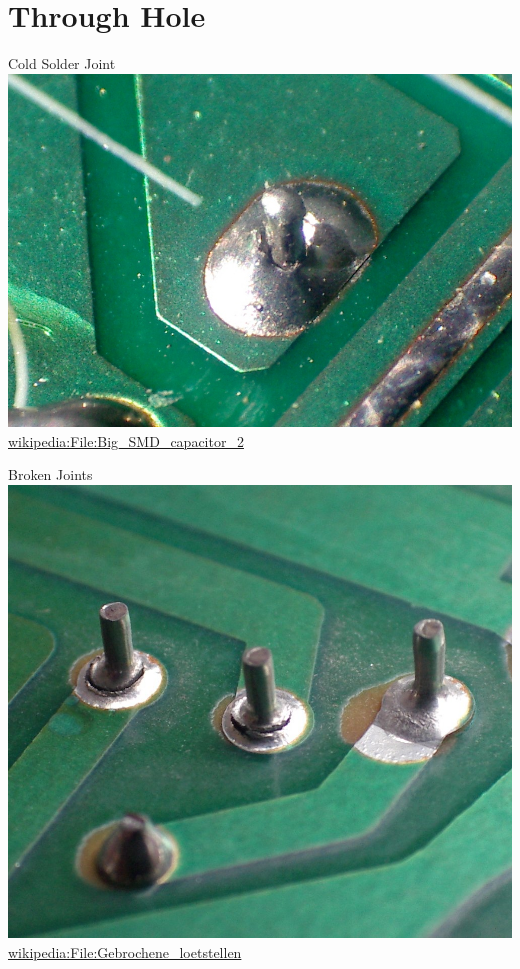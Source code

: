 \documentclass{presentation}
\begin{document}
\section{Through Hole}

\begin{frame}{Cold Solder Joint}
  \centering
  \includegraphics[width=\textwidth*3/4]{./Cold_solder_joint2.jpg} \\
  \url{wikipedia:File:Big_SMD_capacitor_2}
\end{frame}

\begin{frame}{Broken Joints}
  \centering
  \includegraphics[width=\textwidth*3/4]{./Gebrochene_loetstellen.jpg} \\
  \url{wikipedia:File:Gebrochene_loetstellen}
\end{frame}
\end{document}
